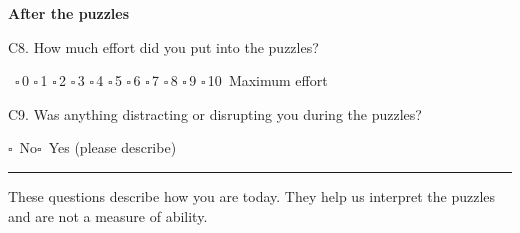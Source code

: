 \documentclass[10pt,a4paper]{article}
\newcommand{\blank}[1][1.2cm]{\rule{#1}{0.4pt}}
\newcommand{\bx}{$\square$}
\begin{document}
\vspace{4pt}\textbf{After the puzzles}\par
C8. How much effort did you put into the puzzles?\par\hspace*{1em}{\small No effort}\ \bx\,0 \bx\,1 \bx\,2 \bx\,3 \bx\,4 \bx\,5 \bx\,6 \bx\,7 \bx\,8 \bx\,9 \bx\,10\ {\small Maximum effort}\par\vspace{6pt}
C9. Was anything distracting or disrupting you during the puzzles?\par\hspace*{1em}\bx\ No\quad \bx\ Yes (please describe)\par\vspace{6pt}
\blank[\linewidth]
{\small These questions describe how you are today. They help us interpret the puzzles and are not a measure of ability.}
\end{document}

